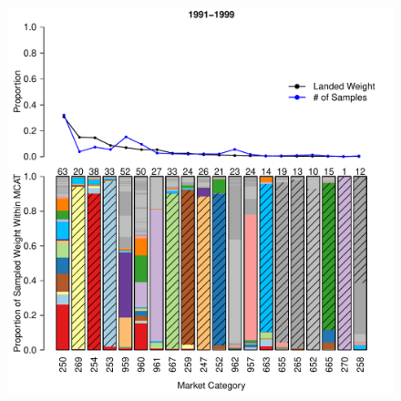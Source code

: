 \documentclass[12pt]{article}
\begin{document}
%
\clearpage
%

\begin{landscape}
\begin{figure}[h!]
\centering
\vspace{-1.2cm}
\includegraphics[height=\textheight]{./pictures/1991to1999Bar3.pdf}

\end{figure}
\end{landscape}
\end{document}
